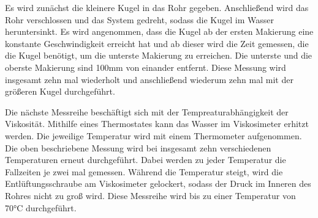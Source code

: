 Es wird zunächst die kleinere Kugel in das Rohr gegeben. Anschließend wird das Rohr verschlossen und das System gedreht, sodass die Kugel im Wasser heruntersinkt.
Es wird angenommen, dass die Kugel ab der ersten Makierung eine konstante Geschwindigkeit erreicht hat und ab dieser wird die Zeit gemessen, die die Kugel benötigt, um die unterste Makierung zu erreichen. Die unterste und die oberste Makierung sind 100mm von einander entfernt.
Diese Messung wird insgesamt zehn mal wiederholt und anschließend wiederum zehn mal mit der größeren Kugel durchgeführt.

Die nächste Messreihe beschäftigt sich mit der Tempreaturabhängigkeit der Viskosität. Mithilfe eines Thermostates kann das Wasser im Viskosimeter erhitzt werden. Die jeweilige Temperatur wird mit einem Thermometer aufgenommen.
Die oben beschriebene Messung wird bei insgesamt zehn verschiedenen Temperaturen erneut durchgeführt. Dabei werden zu jeder Temperatur die Fallzeiten je zwei mal gemessen.
Während die Temperatur steigt, wird die Entlüftungsschraube am Viskosimeter gelockert, sodass der Druck im Inneren des Rohres nicht zu groß wird.
Diese Messreihe wird bis zu einer Temperatur von 70°C durchgeführt.
